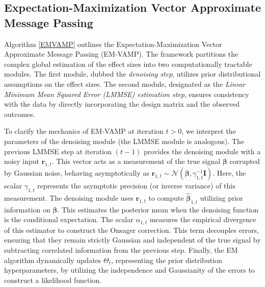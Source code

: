 \subsection{Expectation-Maximization Vector Approximate Message Passing}

Algorithm \ref{EMVAMP} outlines the Expectation-Maximization Vector Approximate Message Passing (EM-VAMP). The framework partitions the complex global estimation of the effect sizes into two computationally tractable modules. The first module, dubbed the \textit{denoising step}, utilizes prior distributional assumptions on the effect sizes. The second module, designated as the \textit{Linear Minimum Mean Squared Error (LMMSE) estimation step}, ensures consistency with the data by directly incorporating the design matrix and the observed outcomes.

To clarify the mechanics of EM-VAMP at iteration $t>0$, we interpret the parameters of the denoising module (the LMMSE module is analogous). The previous LMMSE step at iteration $(t-1)$ provides the denoising module with a noisy input $\bm{r}_{1,t}$. This vector acts as a measurement of the true signal $\bm{\beta}$ corrupted by Gaussian noise, behaving asymptotically as $\bm{r}_{1,t} \sim \mathcal{N}(\bm{\beta}, \gamma_{1,t}^{-1} \bm{I})$. Here, the scalar $\gamma_{1,t}$ represents the asymptotic precision (or inverse variance) of this measurement. The denoising module uses $\bm{r}_{1,t}$ to compute $\hat{\bm{\beta}}_{1,t}$ utilizing prior information on $\bm{\beta}$. This estimates the posterior mean when the denoising function is the conditional expectation. The scalar $\alpha_{1,t}$ measures the empirical divergence of this estimator to construct the Onsager correction. This term decouples errors, ensuring that they remain strictly Gaussian and independent of the true signal by subtracting correlated information from the previous step. Finally, the EM algorithm dynamically updates $\Theta_t$, representing the prior distribution hyperparameters, by utilizing the independence and Gaussianity of the errors to construct a likelihood function.

